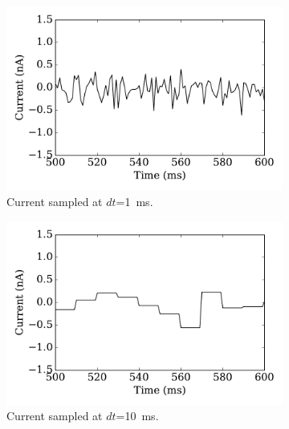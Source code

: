 		
	\begin{figure}[tbp!]
		\centering
		  \par
		\begin{subfigure}[t]{0.43\textwidth}
			\includegraphics[width=\textwidth]{pics_iconip/curr_dt1.pdf}
			\caption{Current sampled at $dt$=1~ms.}
		\end{subfigure}
		\begin{subfigure}[t]{0.43\textwidth}
			\includegraphics[width=\textwidth]{pics_iconip/curr_dt10.pdf}
			\caption{Current sampled at $dt$=10~ms.}
		\end{subfigure}\\
		\begin{subfigure}[t]{0.43\textwidth}

\end{subfigure}
\end{figure}
